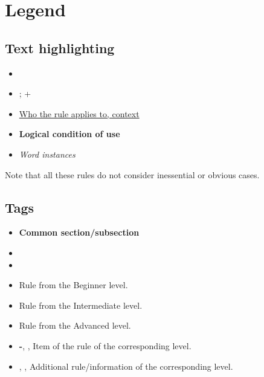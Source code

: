 \section*{Legend}
\label{sec:legend}

\subsection*{Text highlighting}
\begin{itemize}
    \item[\Rightarrow] 
    \item[\Rightarrow] ; +
    \item[\Rightarrow] \underline{Who the rule applies to, context}
    \item[\Rightarrow] \textbf{Logical condition of use}
    \item[\Rightarrow] \textit{Word instances}
\end{itemize}
Note that all these rules do not consider inessential or obvious cases.

\subsection*{Tags}
\begin{itemize}
    \item[\Rightarrow] \textbf{\large Common section/subsection}
    \item[\Rightarrow] 
    \item[\Rightarrow] 
    \item[\Rightarrow] \textbullet{} Rule from the Beginner level.
    \item[\Rightarrow] \doot{} Rule from the Intermediate level.
    \item[\Rightarrow] \dooot{} Rule from the Advanced level.
    \item[\Rightarrow] \textbf{-}, \daash{}, \daaash{} Item of the rule of the corresponding level.
    \item[\Rightarrow] \ast{}, \aast{}, \aaast{} Additional rule/information of the corresponding level.
\end{itemize}